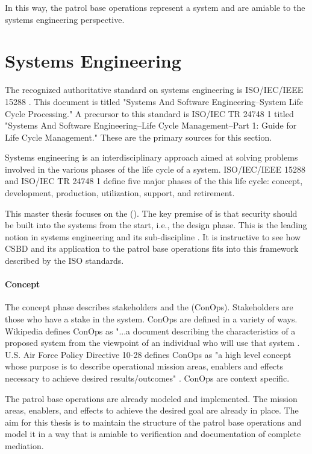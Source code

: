 \documentclass[../../main/main.tex]{subfiles}
\begin{document}
In this way, the patrol base operations represent a system and are amiable to the systems engineering perspective.  

\section{Systems Engineering}\label{sec:se}
The recognized authoritative standard on systems engineering is ISO/IEC/IEEE 15288 \cite{iso15288}.  This document is titled "Systems And Software Engineering--System Life Cycle Processing."  A precursor to this standard is ISO/IEC TR 24748 1 \cite{iso24748} titled "Systems And Software Engineering--Life Cycle Management--Part 1: Guide for Life Cycle Management."   These are the primary sources for this section.

Systems engineering is an interdisciplinary approach aimed at solving problems involved in the various phases of the life cycle of a system.  ISO/IEC/IEEE 15288 and ISO/IEC TR 24748 1 define five major phases of the this life cycle: concept, development, production, utilization, support, and retirement.
  
This master thesis focuses on the  ().  The key premise of  is that security should be built into the systems from the start, i.e., the design phase.  This is the leading notion in systems engineering and its sub-discipline .  It is instructive to see how CSBD and its application to the patrol base operations fits into this framework described by the ISO standards.

\paragraph*{Concept} The concept phase describes stakeholders and the  (ConOps).  Stakeholders are those who have a stake in the system.  ConOps are defined in a variety of ways.  Wikipedia defines ConOps as "...a document describing the characteristics of a proposed system from the viewpoint of an individual who will use that system \cite{wikiconops}.  U.S. Air Force Policy Directive 10-28 defines ConOps as "a high level concept whose purpose is to describe operational mission areas, enablers and effects necessary to achieve desired results/outcomes" \cite{af1028}.  ConOps are context specific.  

The patrol base operations are already modeled and implemented. The mission areas, enablers, and effects to achieve the desired goal are already in place.  The aim for this thesis is to maintain the structure of the patrol base operations and model it in a way that is amiable to verification and documentation of complete mediation.
\end{document}
